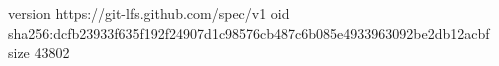 version https://git-lfs.github.com/spec/v1
oid sha256:dcfb23933f635f192f24907d1c98576cb487c6b085e4933963092be2db12acbf
size 43802
